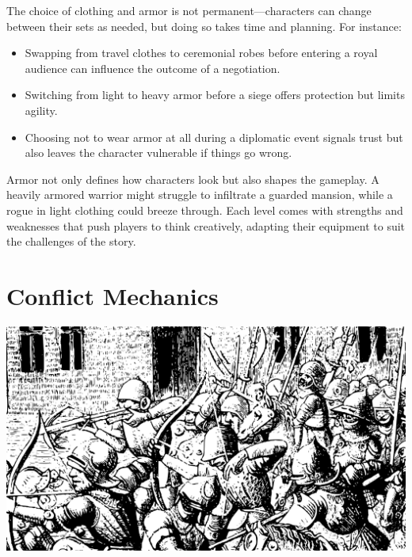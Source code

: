 \documentclass[12pt]{book}
\begin{document}
The choice of clothing and armor is not permanent—characters can change between their sets as needed, but doing so takes time and planning. For instance:

\begin{itemize}
    \item Swapping from travel clothes to ceremonial robes before entering a royal audience can influence the outcome of a negotiation.
    \item Switching from light to heavy armor before a siege offers protection but limits agility.
    \item Choosing not to wear armor at all during a diplomatic event signals trust but also leaves the character vulnerable if things go wrong.
\end{itemize}

Armor not only defines how characters look but also shapes the gameplay. A heavily armored warrior might struggle to infiltrate a guarded mansion, while a rogue in light clothing could breeze through. Each level comes with strengths and weaknesses that push players to think creatively, adapting their equipment to suit the challenges of the story.

\chapter{Conflict Mechanics}

\begin{center}
    \includegraphics[width=\textwidth]{./images/combat01.pdf}
\end{center}
\end{document}
